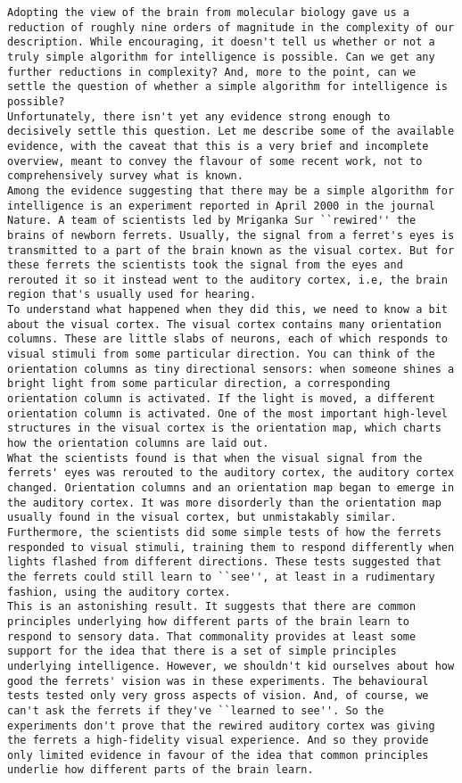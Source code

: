 \begin{lstlisting}
Adopting the view of the brain from molecular biology gave us a reduction of roughly nine orders of magnitude in the complexity of our description. While encouraging, it doesn't tell us whether or not a truly simple algorithm for intelligence is possible. Can we get any further reductions in complexity? And, more to the point, can we settle the question of whether a simple algorithm for intelligence is possible?
Unfortunately, there isn't yet any evidence strong enough to decisively settle this question. Let me describe some of the available evidence, with the caveat that this is a very brief and incomplete overview, meant to convey the flavour of some recent work, not to comprehensively survey what is known.
Among the evidence suggesting that there may be a simple algorithm for intelligence is an experiment reported in April 2000 in the journal Nature. A team of scientists led by Mriganka Sur ``rewired'' the brains of newborn ferrets. Usually, the signal from a ferret's eyes is transmitted to a part of the brain known as the visual cortex. But for these ferrets the scientists took the signal from the eyes and rerouted it so it instead went to the auditory cortex, i.e, the brain region that's usually used for hearing.
To understand what happened when they did this, we need to know a bit about the visual cortex. The visual cortex contains many orientation columns. These are little slabs of neurons, each of which responds to visual stimuli from some particular direction. You can think of the orientation columns as tiny directional sensors: when someone shines a bright light from some particular direction, a corresponding orientation column is activated. If the light is moved, a different orientation column is activated. One of the most important high-level structures in the visual cortex is the orientation map, which charts how the orientation columns are laid out.
What the scientists found is that when the visual signal from the ferrets' eyes was rerouted to the auditory cortex, the auditory cortex changed. Orientation columns and an orientation map began to emerge in the auditory cortex. It was more disorderly than the orientation map usually found in the visual cortex, but unmistakably similar. Furthermore, the scientists did some simple tests of how the ferrets responded to visual stimuli, training them to respond differently when lights flashed from different directions. These tests suggested that the ferrets could still learn to ``see'', at least in a rudimentary fashion, using the auditory cortex.
This is an astonishing result. It suggests that there are common principles underlying how different parts of the brain learn to respond to sensory data. That commonality provides at least some support for the idea that there is a set of simple principles underlying intelligence. However, we shouldn't kid ourselves about how good the ferrets' vision was in these experiments. The behavioural tests tested only very gross aspects of vision. And, of course, we can't ask the ferrets if they've ``learned to see''. So the experiments don't prove that the rewired auditory cortex was giving the ferrets a high-fidelity visual experience. And so they provide only limited evidence in favour of the idea that common principles underlie how different parts of the brain learn.

\end{lstlisting}
